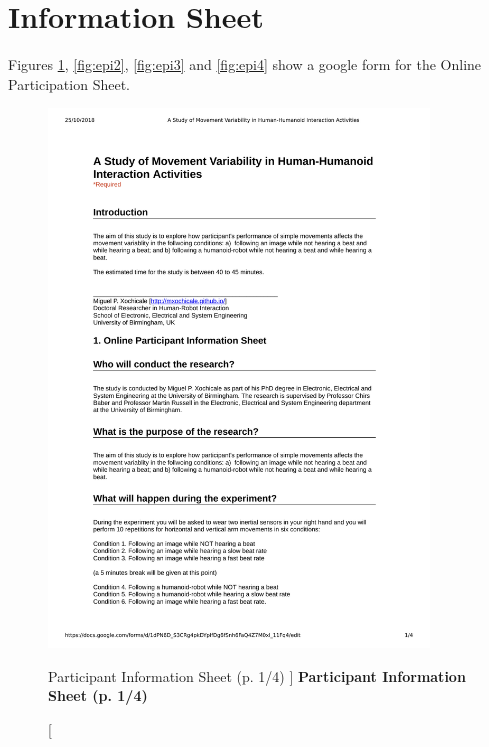 \section{Information Sheet} \label{appendix:d:is}
Figures \ref{fig:epi1}, \ref{fig:epi2}, \ref{fig:epi3} and \ref{fig:epi4}
show a google form for the Online Participation Sheet.

\begin{figure}
 \centering
   \includegraphics[width=0.9\textwidth]{epi1}
   \caption
	[Participant Information Sheet (p. 1/4) ]{
	{\bf Participant Information Sheet (p. 1/4)}
}
   \label{fig:epi1}
\end{figure}
